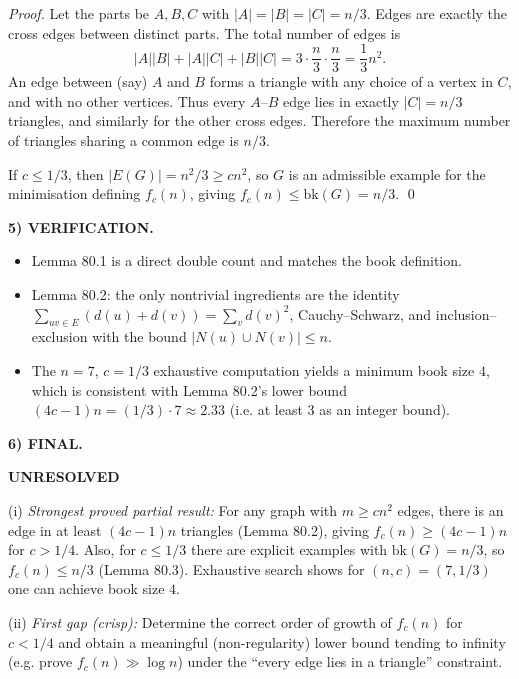 \emph{Proof.}
Let the parts be $A,B,C$ with $|A|=|B|=|C|=n/3$. Edges are exactly the cross edges between distinct parts.
The total number of edges is
\[
|A||B|+|A||C|+|B||C| = 3\cdot \frac{n}{3}\cdot \frac{n}{3}=\frac{1}{3}n^2.
\]
An edge between (say) $A$ and $B$ forms a triangle with any choice of a vertex in $C$, and with no other vertices. Thus every $A$--$B$ edge lies in exactly $|C|=n/3$ triangles, and similarly for the other cross edges. Therefore the maximum number of triangles sharing a common edge is $n/3$.

If $c\le 1/3$, then $|E(G)|=n^2/3\ge c n^2$, so $G$ is an admissible example for the minimisation defining $f_c(n)$, giving $f_c(n)\le \mathrm{bk}(G)=n/3$. \qed

\medskip
\noindent\textbf{5) VERIFICATION.}

\begin{itemize}
\item Lemma 80.1 is a direct double count and matches the book definition.
\item Lemma 80.2: the only nontrivial ingredients are the identity $\sum_{uv\in E}(d(u)+d(v))=\sum_v d(v)^2$, Cauchy--Schwarz, and inclusion--exclusion with the bound $|N(u)\cup N(v)|\le n$.
\item The $n=7$, $c=1/3$ exhaustive computation yields a minimum book size $4$, which is consistent with Lemma 80.2's lower bound $(4c-1)n=(1/3)\cdot 7\approx 2.33$ (i.e. at least $3$ as an integer bound).
\end{itemize}

\medskip
\noindent\textbf{6) FINAL.}

\textbf{UNRESOLVED}

(i) \emph{Strongest proved partial result:} For any graph with $m\ge c n^2$ edges, there is an edge in at least $(4c-1)n$ triangles (Lemma 80.2), giving $f_c(n)\ge (4c-1)n$ for $c>1/4$. Also, for $c\le 1/3$ there are explicit examples with $\mathrm{bk}(G)=n/3$, so $f_c(n)\le n/3$ (Lemma 80.3). Exhaustive search shows for $(n,c)=(7,1/3)$ one can achieve book size $4$.

(ii) \emph{First gap (crisp):} Determine the correct order of growth of $f_c(n)$ for $c<1/4$ and obtain a meaningful (non-regularity) lower bound tending to infinity (e.g. prove $f_c(n)\gg \log n$) under the ``every edge lies in a triangle'' constraint.

